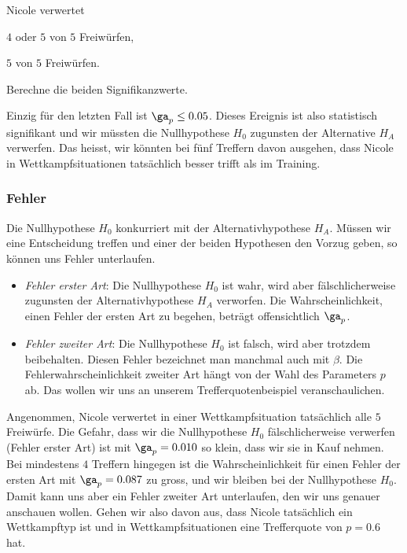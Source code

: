 \documentclass[%
11pt,%
twoside,%
titlepage,%
german,%
headsepline%
]{scrartcl}
\begin{document}
\begin{ueb}
Nicole verwertet
\begin{enumeratea}
\item $4$ oder $5$ von $5$ Freiwürfen,
\item $5$ von $5$ Freiwürfen.
\end{enumeratea}
Berechne die beiden Signifikanzwerte. 
\end{ueb}

Einzig für den letzten Fall ist $\ga_p\leq0.05$. Dieses Ereignis ist also statistisch signifikant und wir müssten die Nullhypothese $H_0$ zugunsten der Alternative $H_A$ verwerfen. Das heisst, wir könnten bei fünf Treffern davon ausgehen, dass Nicole in Wettkampfsituationen tatsächlich besser trifft als im Training.

\subsubsection{Fehler}

Die Nullhypothese $H_0$ konkurriert mit der Alternativhypothese $H_A$. Müssen wir eine Entscheidung treffen und einer der beiden Hypothesen den Vorzug geben, so können uns Fehler unterlaufen.

\begin{itemize}
\item \emph{Fehler erster Art}: Die Nullhypothese $H_0$ ist wahr, wird aber fälschlicherweise zugunsten der Alternativhypothese $H_A$ verworfen. Die Wahrscheinlichkeit, einen Fehler der ersten Art zu begehen, beträgt offensichtlich $\ga_p$.
\item \emph{Fehler zweiter Art}:
Die Nullhypothese $H_0$ ist falsch, wird aber trotzdem beibehalten. Diesen Fehler bezeichnet man manchmal auch mit $\beta$. Die Fehlerwahrscheinlichkeit zweiter Art hängt von der Wahl des Parameters $p$ ab. Das wollen wir uns an unserem Trefferquotenbeispiel veranschaulichen.
\end{itemize}

Angenommen, Nicole verwertet in einer Wettkampfsituation tatsächlich alle $5$ Freiwürfe. Die Gefahr, dass wir die Nullhypothese $H_0$ fälschlicherweise verwerfen (Fehler erster Art) ist mit $\ga_p=0.010$ so klein, dass wir sie in Kauf nehmen. Bei mindestens $4$ Treffern hingegen ist die Wahrscheinlichkeit für einen Fehler der ersten Art mit $\ga_p=0.087$ zu gross, und wir bleiben bei der Nullhypothese $H_0$. Damit kann uns aber ein Fehler zweiter Art unterlaufen, den wir uns genauer anschauen wollen. Gehen wir also davon aus, dass Nicole tatsächlich ein Wettkampftyp ist und in Wettkampfsituationen eine Trefferquote von $p=0.6$ hat.
\end{document}
